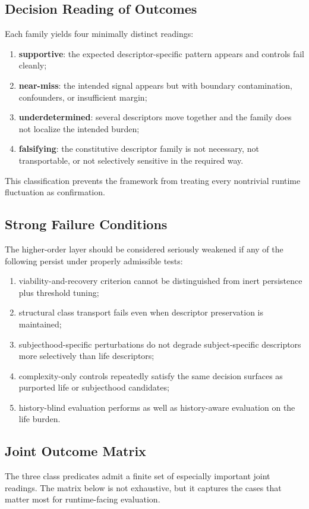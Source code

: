 \documentclass[11pt,a4paper]{article}
\theoremstyle{definition}
\begin{document}
\subsection{Decision Reading of Outcomes}
Each family yields four minimally distinct readings:
\begin{enumerate}[leftmargin=1.5em]
\item \textbf{supportive}: the expected descriptor-specific pattern appears and controls fail cleanly;
\item \textbf{near-miss}: the intended signal appears but with boundary contamination, confounders, or insufficient margin;
\item \textbf{underdetermined}: several descriptors move together and the family does not localize the intended burden;
\item \textbf{falsifying}: the constitutive descriptor family is not necessary, not transportable, or not selectively sensitive in the required way.
\end{enumerate}
This classification prevents the framework from treating every nontrivial runtime fluctuation as confirmation.

\subsection{Strong Failure Conditions}
The higher-order layer should be considered seriously weakened if any of the following persist under properly admissible tests:
\begin{enumerate}[leftmargin=1.5em]
\item viability-and-recovery criterion cannot be distinguished from inert persistence plus threshold tuning;
\item structural class transport fails even when descriptor preservation is maintained;
\item subjecthood-specific perturbations do not degrade subject-specific descriptors more selectively than life descriptors;
\item complexity-only controls repeatedly satisfy the same decision surfaces as purported life or subjecthood candidates;
\item history-blind evaluation performs as well as history-aware evaluation on the life burden.
\end{enumerate}

\subsection{Joint Outcome Matrix}
The three class predicates admit a finite set of especially important joint readings. The matrix below is not exhaustive, but it captures the cases that matter most for runtime-facing evaluation.
\end{document}
